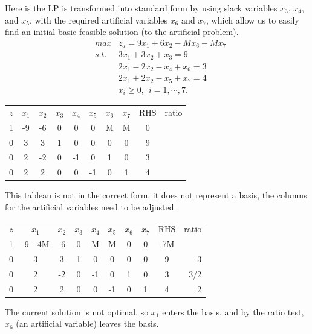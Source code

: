 Here is the LP is transformed into standard form by using slack variables $x_3$, $x_4$, and $x_5$, with the required artificial variables $x_6$ and $x_7$, which allow us to easily find an initial basic feasible solution (to the artificial problem).
\begin{eqnarray}
& max  & z_a = 9x_1 + 6x_2 -M x_6 - M x_7 \nonumber \\
& s.t. & 3x_1 + 3x_2 + x_3 = 9 \nonumber \\
&      & 2x_1 - 2x_2 - x_4 + x_6 = 3 \nonumber \\
&      & 2x_1 + 2x_2 - x_5 + x_7 = 4 \nonumber \\
&      & x_i \ge 0,~~ i =1,\cdots,7. \nonumber
\end{eqnarray}

\begin{center} \begin{tabular} {|c|c|c|c|c|c|c|c||c| r} \cline{1-9}
$z$	& $x_1$	& $x_2$	& $x_3$	& $x_4$	& $x_5$	& $x_6$	& $x_7$	& RHS &	ratio \\ \cline{1-9}
1	&	 -9 &	 -6 &	 0 &	  0 &	  0 &	  M &	  M &	0 & \\
0	&	  3 &	  3 &	 1 &	  0 &	  0 &	  0 &	  0 &	9 &	 \\
0	&	  2 &	 -2 &	 0 &	 -1 &	  0 &	  1 &	  0 &	3 & \\
0	&	  2 &	  2 &	 0 &	  0 &	 -1 &	  0 &	  1 &	4 &	 \\
\cline{1-9}
\end{tabular} \end{center}
\noindent This tableau is not in the correct form, it does not represent a basis, the columns for the artificial variables need to be adjusted.

\begin{center} \begin{tabular} {|c|c|c|c|c|c|c|c||c| r} \cline{1-9}
$z$	& $x_1$	  & $x_2$  & $x_3$	& $x_4$	& $x_5$	& $x_6$	& $x_7$	& RHS &	ratio \\ \cline{1-9}
1	& -9 - 4M & -6     &	 0 &	  M &	  M &	  0 &	  0 & -7M &	      \\
0	&	  3   &	     3 &	 1 &	  0 &	  0 &	  0 &	  0 &	9 &	3     \\
0	&	  2   &	    -2 &	 0 &	 -1 &	  0 &	  1 &	  0 &	3 &	3/2   \\
0	&	  2   &	     2 &	 0 &	  0 &	 -1 &	  0 &	  1 &	4 &	2     \\
\cline{1-9}
\end{tabular} \end{center}
\noindent The current solution is not optimal, so $x_1$ enters the basis, and by the ratio test, $x_6$ (an artificial variable) leaves the basis.


